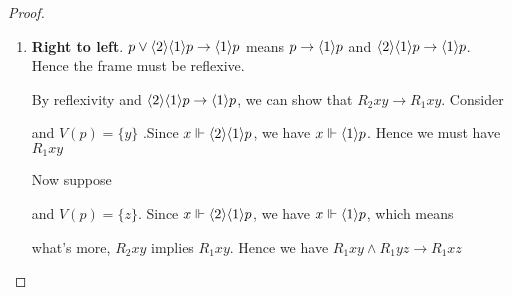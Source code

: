 \documentclass[11pt]{article}
\begin{document}
\begin{proof}
\begin{enumerate}
\item \textbf{Right to left}.
\(p\vee\langle2\rangle\langle1\rangle p\to\langle1\rangle p\) means \(p\to\langle1\rangle p\) and \(\langle2\rangle\langle1\rangle
      p\to\langle1\rangle p\). Hence the frame must be reflexive.

By reflexivity and \(\langle2\rangle\langle1\rangle p\to\langle1\rangle p\), we can show that
\(R_2xy\to R_1xy\). Consider
\begin{center}\end{center}
and \(V(p)=\{y\}\)
.Since \(x\Vdash\langle2\rangle\langle1\rangle p\), we have \(x\Vdash\langle1\rangle p\). Hence we
must have \(R_1xy\)

Now suppose
\begin{center}\end{center}
and \(V(p)=\{z\}\). Since \(x\Vdash\langle2\rangle\langle1\rangle p\), we have
\(x\Vdash\langle1\rangle p\), which means
\begin{center}\end{center}
what's more, \(R_2xy\) implies \(R_1xy\). Hence we have \(R_1xy\wedge
      R_1yz\to R_1xz\)
\end{enumerate}
\end{proof}
\end{document}

